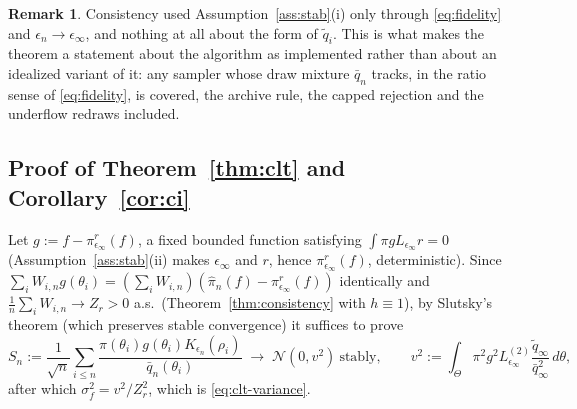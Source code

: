 \documentclass[pdflatex,sn-mathphys-num]{sn-jnl}
\theoremstyle{plain}
\theoremstyle{definition}
\newtheorem{remark}{Remark}
\begin{document}
\begin{appendices}
\begin{remark}\label{rem:weaker-c4}
Consistency used Assumption~\ref{ass:stab}(i) only through \eqref{eq:fidelity} and $\epsilon_n\to\epsilon_\infty$, and nothing at all about the form of $\tilde q_i$. This is what makes the theorem a statement about the algorithm as implemented rather than about an idealized variant of it: any sampler whose draw mixture $\bar q_n$ tracks, in the ratio sense of \eqref{eq:fidelity}, is covered, the archive rule, the capped rejection and the underflow redraws included.
\end{remark}

\subsection{Proof of Theorem~\ref{thm:clt} and Corollary~\ref{cor:ci}}\label{app:theory-clt}
Let $g:=f-\pi^r_{\epsilon_\infty}(f)$, a fixed bounded function satisfying $\int\pi gL_{\epsilon_\infty}r=0$ (Assumption~\ref{ass:stab}(ii) makes $\epsilon_\infty$ and $r$, hence $\pi^r_{\epsilon_\infty}(f)$, deterministic). Since $\sum_iW_{i,n}g(\theta_i)=(\sum_iW_{i,n})(\widehat\pi_n(f)-\pi^r_{\epsilon_\infty}(f))$ identically and $\tfrac1n\sum_iW_{i,n}\to Z_r>0$ a.s.\ (Theorem~\ref{thm:consistency} with $h\equiv1$), by Slutsky's theorem (which preserves stable convergence) it suffices to prove
\begin{equation}
S_n:=\frac{1}{\sqrt n}\sum_{i\le n}\frac{\pi(\theta_i)g(\theta_i)K_{\epsilon_n}(\rho_i)}{\bar q_n(\theta_i)}
\;\longrightarrow\;\mathcal{N}(0,v^2)\ \text{stably},
\qquad
v^2:=\int_\Theta\pi^2g^2L^{(2)}_{\epsilon_\infty}\frac{\tilde q_\infty}{\bar q^2_\infty}\,d\theta,
\label{eq:app-clt-target}
\end{equation}
after which $\sigma^2_f=v^2/Z^2_r$, which is \eqref{eq:clt-variance}.


\end{appendices}
\end{document}
